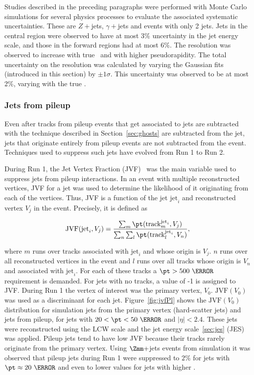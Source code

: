 \par Studies described in the preceding paragraphs were performed with Monte Carlo simulations 
for several physics processes to evaluate the associated systematic uncertainties. 
These are $Z+$jets, $\gamma+$jets and events with only 2 jets. Jets in the central region were observed 
to have at most 3\% uncertainty in the jet energy scale, and those in the forward regions 
had at most 6\%. The resolution was observed to increase with true \pt\ and with higher pseudorapidity. 
The total uncertainty on the resolution was calculated by varying the Gaussian fits (introduced in this 
section) by $\pm 1\sigma$. This uncertainty was observed to be at most 2\%, varying with the 
true \pt.  

\subsubsection{Jets from pileup}
\par Even after tracks from pileup events that get associated to jets are subtracted with 
the technique described in Section~\ref{sec:ghosts} are subtracted from the jet, jets that originate 
entirely from pileup events are not subtracted from the event. Techniques used to suppress such jets have 
evolved from Run 1 to Run 2. 

\par During Run 1, the Jet Vertex Fraction (JVF)~\cite{TheATLAScollaboration:2013pia} was the main variable used 
to suppress jets from pileup interactions. In an event with multiple reconstructed vertices, 
JVF for a jet was used to determine the likelihood of it originating from each of the 
vertices. Thus, JVF is a function of the jet $\text{jet}_i$ and reconstructed vertex $V_j$ in the 
event. Precisely, it is defined as 

\begin{equation}
\text{JVF}(\text{jet}_i,V_j) = \frac{\sum_m\pt(\text{track}_m^{\text{jet}_i},V_j)}{\sum_n\sum_l\pt(\text{track}_l^{\text{jet}_i},V_n)},
\label{eq:jvf}
\end{equation}  

where $m$ runs over tracks associated with $\text{jet}_i$ and whose origin is $V_j$. $n$ runs over all reconstructed vertices in 
the event and $l$ runs over all tracks whose origin is $V_n$ and associated with
 $\text{jet}_i$. For each of these tracks a $\pt>500~\MeV$ 
requirement is demanded. For jets with no tracks, a value of -1 is assigned to JVF. During Run 1 the vertex of interest was 
the primary vertex, $V_0$. $\text{JVF}(V_0)$ was used as a discriminant for each jet. 
Figure~\ref{fig:jvfPl} shows the $\text{JVF}(V_0)$ distribution for simulation jets from the primary vertex (hard-scatter jets) 
and jets from pileup, for jets with $20<\pt<50~\GeV$ and $|\eta|<2.4$. These jets were reconstructed using the LCW 
scale and the jet energy scale~\ref{sec:jes} (JES) was applied. Pileup jets tend to have low JVF 
because their tracks rarely originate from the primary vertex. Using $\Zmm+$jets events from simulation 
it was observed that pileup jets during Run 1 were suppressed to $2\%$ for jets with $\pt\approx20~\GeV$ 
and even to lower values for jets with higher \pt. 

